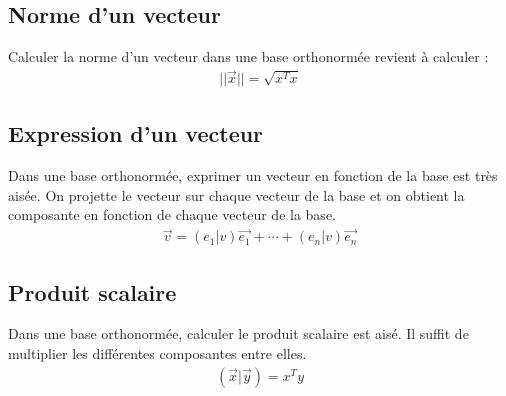 \documentclass[a4paper]{book}
\begin{document}
\subsection{Norme d'un vecteur}
Calculer la norme d'un vecteur dans une base orthonormée revient à calculer :
\begin{gather}
    ||\Vec{x}|| = \sqrt{x^Tx}
\end{gather}
\subsection{Expression d'un vecteur}
Dans une base orthonormée, exprimer un vecteur en fonction de la base est très aisée. 
On projette le vecteur sur chaque vecteur de la base et on obtient la composante en fonction de chaque vecteur de la base.
\begin{gather}
    \Vec{v} = (e_1|v)\Vec{e_1} + \cdots + (e_n|v)\Vec{e_n}
\end{gather}
\subsection{Produit scalaire}
Dans une base orthonormée, calculer le produit scalaire est aisé. Il suffit de multiplier les différentes composantes entre elles.
\begin{gather}
    (\Vec{x}|\Vec{y}) = x^Ty
\end{gather}
\end{document}
